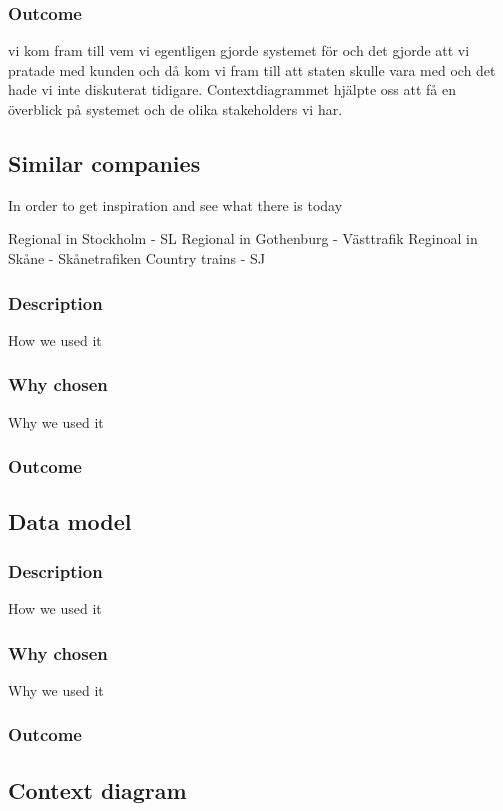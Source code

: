 \documentclass[a4paper]{article}
\begin{document}
    \subsubsection{Outcome}
    vi kom fram till vem vi egentligen gjorde systemet för och det gjorde att vi pratade med kunden och då kom vi fram till att staten skulle vara med och det hade vi inte diskuterat tidigare. 
Contextdiagrammet hjälpte oss att få en överblick på systemet och de olika stakeholders vi har.
    
    \subsection{Similar companies}
    In order to get inspiration and see what there is today
	
    Regional in Stockholm - SL
    Regional in Gothenburg - Västtrafik
    Reginoal in Skåne - Skånetrafiken
    Country trains - SJ
    
    \subsubsection{Description}
    How we used it
    \subsubsection{Why chosen}
    Why we used it
    \subsubsection{Outcome}
    

    \subsection{Data model}

    \subsubsection{Description}
    How we used it
    \subsubsection{Why chosen}
    Why we used it
    \subsubsection{Outcome}

    \subsection{Context diagram}
\end{document}
